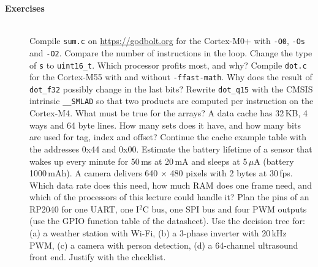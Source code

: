 \begin{description}
\item[{\rot\bf Exercises}]~\\[-\lblskip]
\bi
	\ite Compile \texttt{sum.c} on \url{https://godbolt.org} for the Cortex-M0+ with \texttt{-O0}, \texttt{-Os} and \texttt{-O2}. Compare the number of instructions in the loop.
	\ite Change the type of \texttt{s} to \texttt{uint16\_t}. Which processor profits most, and why?
	\ite Compile \texttt{dot.c} for the Cortex-M55 with and without \texttt{-ffast-math}. Why does the result of \texttt{dot\_f32} possibly change in the last bits?
	\ite Rewrite \texttt{dot\_q15} with the CMSIS intrinsic \texttt{\_\_SMLAD} so that two products are computed per instruction on the Cortex-M4. What must be true for the arrays?
	\ite A data cache has 32\,KB, 4 ways and 64 byte lines. How many sets does it have, and how many bits are used for tag, index and offset? Continue the cache example table with the addresses 0x44 and 0x00.
	\ite Estimate the battery lifetime of a sensor that wakes up every minute for 50\,ms at 20\,mA and sleeps at 5\,$\mu$A (battery 1000\,mAh).
	\ite A camera delivers 640 $\times$ 480 pixels with 2 bytes at 30\,fps. Which data rate does this need, how much RAM does one frame need, and which of the processors of this lecture could handle it?
	\ite Plan the pins of an RP2040 for one UART, one I$^2$C bus, one SPI bus and four PWM outputs (use the GPIO function table of the datasheet).
	\ite Use the decision tree for: (a) a weather station with Wi-Fi, (b) a 3-phase inverter with 20\,kHz PWM, (c) a camera with person detection, (d) a 64-channel ultrasound front end. Justify with the checklist.
\ei
\end{description}
